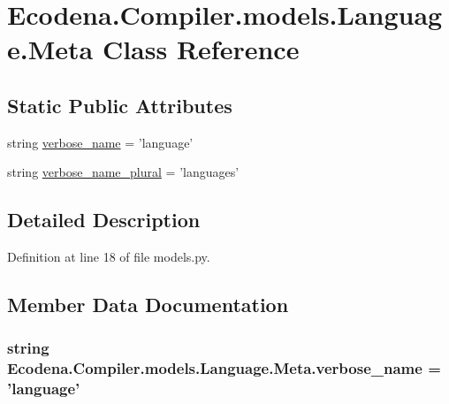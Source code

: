 \hypertarget{class_ecodena_1_1_compiler_1_1models_1_1_language_1_1_meta}{
\section{Ecodena.Compiler.models.Language.Meta Class Reference}
\label{da/d0f/class_ecodena_1_1_compiler_1_1models_1_1_language_1_1_meta}
}
\subsection*{Static Public Attributes}
\begin{DoxyCompactItemize}
\item 
string \hyperlink{class_ecodena_1_1_compiler_1_1models_1_1_language_1_1_meta_a322c0560e4ad8288d022ee46f4c8cea5}{verbose\_\-name} = 'language'
\item 
string \hyperlink{class_ecodena_1_1_compiler_1_1models_1_1_language_1_1_meta_a73f1a2a1b08628a1086c57fb2a99ef25}{verbose\_\-name\_\-plural} = 'languages'
\end{DoxyCompactItemize}


\subsection{Detailed Description}


Definition at line 18 of file models.py.



\subsection{Member Data Documentation}
\hypertarget{class_ecodena_1_1_compiler_1_1models_1_1_language_1_1_meta_a322c0560e4ad8288d022ee46f4c8cea5}{
\subsubsection[{verbose\_\-name}]{\setlength{\rightskip}{0pt plus 5cm}string {\bf Ecodena.Compiler.models.Language.Meta.verbose\_\-name} = 'language'}}
\label{da/d0f/class_ecodena_1_1_compiler_1_1models_1_1_language_1_1_meta_a322c0560e4ad8288d022ee46f4c8cea5}


